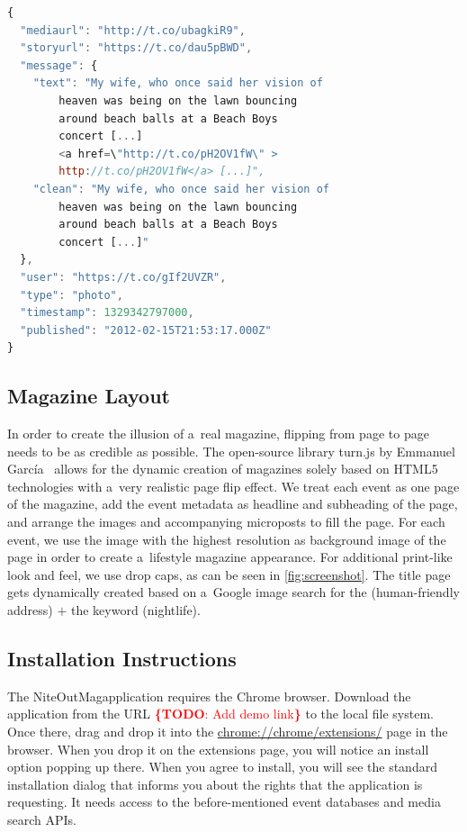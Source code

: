 \documentclass{acm_proc_article-sp}
\newcommand{\todo}[1]{\noindent\textcolor{red}{{\bf \{TODO}: #1{\bf \}}}}
\begin{document}
\begin{lstlisting}[language=JavaScript,caption={Sample output of the media collector showing a~\mbox{Google+} post (edited for legibility, URLs shortened).},label={lst:media}]
{
  "mediaurl": "http://t.co/ubagkiR9",
  "storyurl": "https://t.co/dau5pBWD",
  "message": {
    "text": "My wife, who once said her vision of
        heaven was being on the lawn bouncing
        around beach balls at a Beach Boys
        concert [...]
        <a href=\"http://t.co/pH2OV1fW\" >
        http://t.co/pH2OV1fW</a> [...]",
    "clean": "My wife, who once said her vision of
        heaven was being on the lawn bouncing
        around beach balls at a Beach Boys
        concert [...]"
  },
  "user": "https://t.co/gIf2UVZR",
  "type": "photo",
  "timestamp": 1329342797000,
  "published": "2012-02-15T21:53:17.000Z"
}
\end{lstlisting}

\subsection{Magazine Layout}
In order to create the illusion of a~real magazine,
flipping from page to page needs to be as credible as possible.
The open-source library turn.js by Emmanuel García~\cite{TurnJs2012}
allows for the dynamic creation of magazines solely based on HTML5 technologies
with a~very realistic page flip effect.
We treat each event as one page of the magazine,
add the event metadata as headline and subheading of the page,
and arrange the images and accompanying microposts to fill the page.
For each event, we use the image with the highest resolution
as background image of the page in order to create a~lifestyle magazine appearance.
For additional print-like look and feel, we use drop caps,
as can be seen in \autoref{fig:screenshot}.
The title page gets dynamically created based on a~Google image search
for the (human-friendly address) $+$ the keyword (nightlife).

\subsection{Installation Instructions}
The NiteOutMag\texttrademark application requires the Chrome browser.
Download the application from the URL \todo{Add demo link} to the local file system.
Once there, drag and drop it into the \url{chrome://chrome/extensions/} page in the browser.
When you drop it on the extensions page, you will notice an install option popping up there.
When you agree to install, you will see the standard installation dialog
that informs you about the rights that the application is requesting.
It needs access to the before-mentioned event databases and media search APIs.
\end{document}
